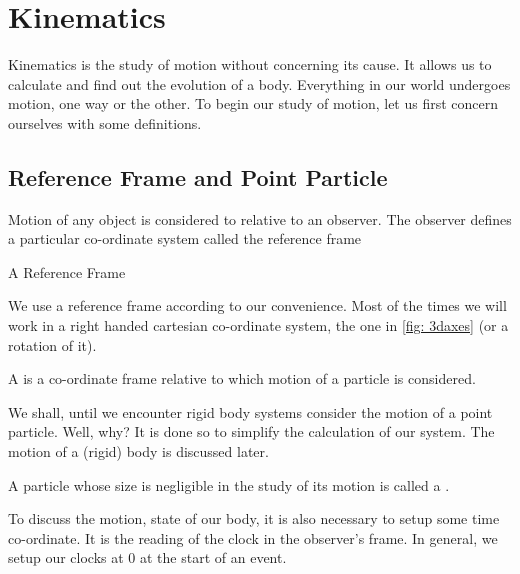 \chapter{Kinematics}
Kinematics is the study of motion without concerning its cause. It allows
us to calculate and find out the evolution of a body. Everything in our world undergoes
motion, one way or the other. To begin our study of motion, let us first
concern ourselves with some definitions.

\section{Reference Frame and Point Particle}

Motion of any object is considered to relative to an observer. The observer defines
a particular co-ordinate system called the reference frame

\begin{marginfigure}
        \centering
        \vspace{-9em}
    \caption{A Reference Frame}\label{fig: 3daxes}
\end{marginfigure}

We use a reference frame according to our convenience. Most of the times we will work in a right 
handed cartesian co-ordinate system, the one in \cref{fig: 3daxes} (or a rotation of it).

\begin{definition}
    A  is a co-ordinate frame relative to which motion of a particle is considered.
\end{definition}

We shall, until we encounter rigid body systems consider the motion of a point particle. 
Well, why? It is done so to simplify the calculation of our system. The motion of a (rigid) body is discussed later.

\begin{definition}
    A particle whose size is negligible in the study of its motion is called a .
\end{definition}

To discuss the motion, state of our body, it is also necessary to setup some time co-ordinate.
It is the reading of the clock in the observer's frame. In general, we setup our clocks
at \(0\) at the start of an event.


